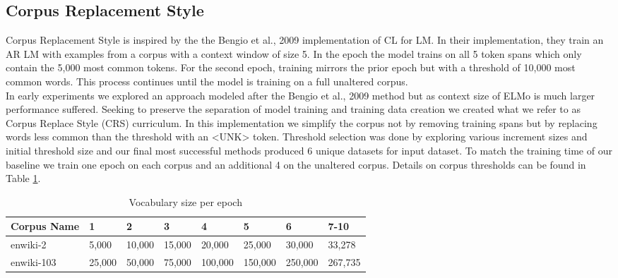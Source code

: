 \subsection{Corpus Replacement Style}
Corpus Replacement Style is inspired by the the Bengio et al., 2009 \cite{Bengio2009CurriculumL} implementation of CL for LM. In their implementation, they train an AR LM with examples from a corpus with a context window of size 5. In the epoch the model trains on all 5 token spans which only contain the 5,000 most common tokens. For the second epoch, training mirrors the prior epoch but with a threshold of 10,000 most common words. This process continues until the model is training on a full unaltered corpus. \\
In early experiments we explored an approach modeled after the Bengio et al., 2009 method but as context size of ELMo is much larger performance suffered. Seeking to preserve the separation of model training and training data creation we created what we refer to as Corpus Replace Style (CRS) curriculum. In this implementation we simplify the corpus not by removing training spans but by replacing words less common than the threshold with an <UNK> token. Threshold selection was done by exploring various increment sizes and initial threshold size and our final most successful methods produced 6 unique datasets for input dataset. To match the training time of our baseline we train one epoch on each corpus and an additional 4 on the unaltered corpus. Details on corpus thresholds can be found in Table \ref{table:2}.
\begin{table}[h!]
\begin{center}
\begin{tabular}{|l|l|l|l|l|l|l|l|} \hline
\textbf{Corpus Name} & \textbf{1} & \textbf{2} & \textbf{3} & \textbf{4} & \textbf{5} & \textbf{6} & \textbf{7-10}  \\ \hline
enwiki-2 & 5,000 & 10,000 & 15,000 & 20,000 & 25,000 & 30,000 & 33,278 \\ \hline
enwiki-103 & 25,000 & 50,000 & 75,000 & 100,000 & 150,000  & 250,000 & 267,735\\ \hline
\end{tabular}
\caption{Vocabulary size per epoch}
\label{table:2}
\end{center}
\end{table}
